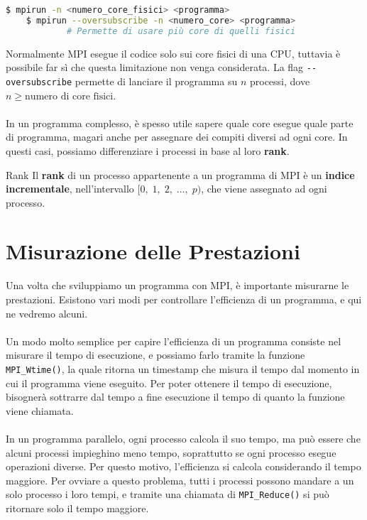 \begin{lstlisting}[language = bash, numbers = none, columns=fullflexible]
    $ mpirun -n <numero_core_fisici> <programma>
    $ mpirun --oversubscribe -n <numero_core> <programma>
            # Permette di usare più core di quelli fisici
\end{lstlisting}

Normalmente MPI esegue il codice solo sui core fisici di una CPU, tuttavia è possibile far sì che questa limitazione non venga considerata. La flag \verb|--oversubscribe| permette di lanciare il programma su $n$ processi, dove $n \geq \text{numero di core fisici}$.
\\\\
In un programma complesso, è spesso utile sapere quale core esegue quale parte di programma, magari anche per assegnare dei compiti diversi ad ogni core. In questi casi, possiamo differenziare i processi in base al loro \textbf{rank}.

\begin{definition}{Rank}
    Il \textbf{rank} di un processo appartenente a un programma di MPI è un \textbf{indice incrementale}, nell'intervallo $[0, \; 1, \; 2, \; \dots , \; p)$, che viene assegnato ad ogni processo.
\end{definition}


\section{Misurazione delle Prestazioni}

Una volta che sviluppiamo un programma con MPI, è importante misurarne le prestazioni. Esistono vari modi per controllare l'efficienza di un programma, e qui ne vedremo alcuni.
\\\\
Un modo molto semplice per capire l'efficienza di un programma consiste nel misurare il tempo di esecuzione, e possiamo farlo tramite la funzione \verb|MPI_Wtime()|, la quale ritorna un timestamp che misura il tempo dal momento in cui il programma viene eseguito. Per poter ottenere il tempo di esecuzione, bisognerà sottrarre dal tempo a fine esecuzione il tempo di quanto la funzione viene chiamata.
\\\\
In un programma parallelo, ogni processo calcola il suo tempo, ma può essere che alcuni processi impieghino meno tempo, soprattutto se ogni processo esegue operazioni diverse. Per questo motivo, l'efficienza si calcola considerando il tempo maggiore. Per ovviare a questo problema, tutti i processi possono mandare a un solo processo i loro tempi, e tramite una chiamata di \verb|MPI_Reduce()| si può ritornare solo il tempo maggiore.

